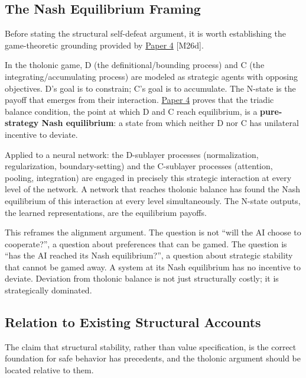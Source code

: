 \documentclass[12pt]{article}
\begin{document}
\subsection{The Nash Equilibrium Framing}\label{the-nash-equilibrium-framing}

Before stating the structural self-defeat argument, it is worth
establishing the game-theoretic grounding provided by
\href{https://github.com/baardev/truevalue/blob/main/docnav/Research/papers/4_game-theoretic-triadic-balance/4_game-theoretic-triadic-balance.pdf}{Paper
4} {[}M26d{]}.

In the tholonic game, D (the definitional/bounding process) and C (the
integrating/accumulating process) are modeled as strategic agents with
opposing objectives. D's goal is to constrain; C's goal is to
accumulate. The N-state is the payoff that emerges from their
interaction.
\href{https://github.com/baardev/truevalue/blob/main/docnav/Research/papers/4_game-theoretic-triadic-balance/4_game-theoretic-triadic-balance.pdf}{Paper
4} proves that the triadic balance condition, the point at which D and C
reach equilibrium, is a \textbf{pure-strategy Nash equilibrium}: a state
from which neither D nor C has unilateral incentive to deviate.

Applied to a neural network: the D-sublayer processes (normalization,
regularization, boundary-setting) and the C-sublayer processes
(attention, pooling, integration) are engaged in precisely this
strategic interaction at every level of the network. A network that
reaches tholonic balance has found the Nash equilibrium of this
interaction at every level simultaneously. The N-state outputs, the
learned representations, are the equilibrium payoffs.

This reframes the alignment argument. The question is not ``will the AI
choose to cooperate?'', a question about preferences that can be gamed.
The question is ``has the AI reached its Nash equilibrium?'', a question
about strategic stability that cannot be gamed away. A system at its
Nash equilibrium has no incentive to deviate. Deviation from tholonic
balance is not just structurally costly; it is strategically dominated.

\subsection{Relation to Existing Structural Accounts}\label{relation-to-existing-structural-accounts}

The claim that structural stability, rather than value specification, is
the correct foundation for safe behavior has precedents, and the
tholonic argument should be located relative to them.
\end{document}
